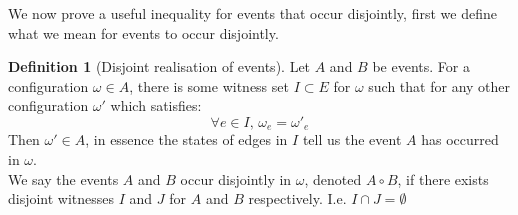 \documentclass[a4paper,11pt]{article}
\theoremstyle{definition}
\newtheorem{definition}[theorem]{Definition}
\begin{document}
We now prove a useful inequality for events that occur disjointly, first we define what we mean for events to occur disjointly.
\begin{definition}[Disjoint realisation of events]
	Let $A$ and $B$ be events. For a configuration $\omega \in A$, there is some witness set $I \subset E$ for $\omega$ such that for any other configuration $\omega'$ which satisfies:
	$$\forall e \in I \text{, } \omega_e = \omega'_e$$
	Then $\omega' \in A$, in essence the states of edges in $I$ tell us the event $A$ has occurred in $\omega$.\\
	We say the events $A$ and $B$ occur disjointly in $\omega$, denoted $A \circ B$, if there exists disjoint witnesses $I$ and $J$ for $A$ and $B$ respectively. I.e. $I \cap J = \emptyset$

\end{definition}
\end{document}
